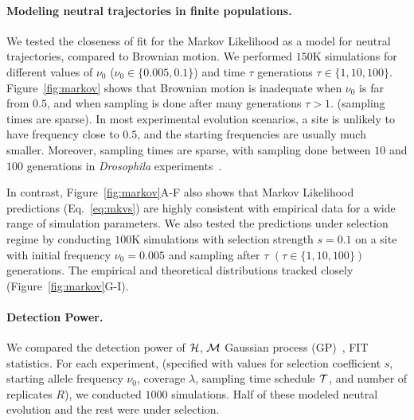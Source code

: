 \documentclass[11pt]{article}
\begin{document}
\paragraph{Modeling neutral trajectories in finite populations.} 
We tested the closeness of fit for the Markov Likelihood as a model
for neutral trajectories, compared to Brownian motion. We performed
$150$K simulations for different values of $\nu_0$
($\nu_0\in\{0.005,0.1\}$) and time $\tau$ generations $\tau\in
\{1,10,100\}$. 
Figure~\ref{fig:markov} shows that Brownian motion is inadequate when
$\nu_0$ is far from $0.5$, and when sampling is done after many
generations $\tau>1$. (sampling times are sparse). In most
experimental evolution scenarios, a site is unlikely to have frequency
close to $0.5$, and the starting frequencies are usually much
smaller. Moreover, sampling times are sparse, with sampling done
between $10$ and $100$ generations in \emph{Drosophila}
experiments~\cite{orozco2012adaptation, zhou2011experimental}.

In contrast, Figure~\ref{fig:markov}A-F also shows that Markov
Likelihood predictions (Eq.~\ref{eq:mkvs}) are highly consistent with
empirical data for a wide range of simulation parameters. We also
tested the predictions under selection regime by conducting $100$K
simulations with selection strength $s=0.1$ on a site with initial
frequency $\nu_0=0.005$ and sampling after $\tau$
$(\tau\in\{1,10,100\})$ generations. The empirical and theoretical
distributions tracked closely (Figure~\ref{fig:markov}G-I).

\paragraph{Detection Power.} We compared the detection power of ${\cal H}$, ${\cal M}$
Gaussian process (GP)~\cite{Terhorst2015Multi},
FIT~\cite{feder2014Identifying} statistics.  For each experiment,
(specified with values for selection coefficient $s$, starting allele
frequency $\nu_0$, coverage $\lambda$, sampling time schedule ${\cal
  T}$, and number of replicates $R$), we conducted $1000$
simulations. Half of these modeled neutral evolution and the rest were
under selection. 
\end{document}

